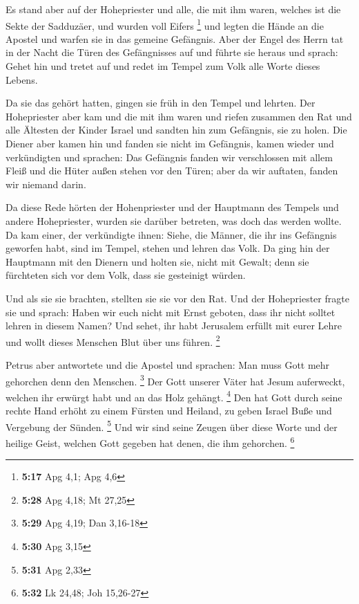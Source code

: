  Es stand aber auf der Hohepriester und alle, die mit ihm
waren, welches ist die Sekte der Sadduzäer, und wurden voll Eifers
\footnote{\textbf{5:17} Apg 4,1; Apg 4,6}  und legten die
Hände an die Apostel und warfen sie in das gemeine Gefängnis.
 Aber der Engel des Herrn tat in der Nacht die Türen des
Gefängnisses auf und führte sie heraus und sprach:  Gehet
hin und tretet auf und redet im Tempel zum Volk alle Worte dieses
Lebens.

 Da sie das gehört hatten, gingen sie früh in den Tempel
und lehrten. Der Hohepriester aber kam und die mit ihm waren und riefen
zusammen den Rat und alle Ältesten der Kinder Israel und sandten hin zum
Gefängnis, sie zu holen.  Die Diener aber kamen hin und
fanden sie nicht im Gefängnis, kamen wieder und verkündigten
 und sprachen: Das Gefängnis fanden wir verschlossen mit
allem Fleiß und die Hüter außen stehen vor den Türen; aber da wir
auftaten, fanden wir niemand darin.

 Da diese Rede hörten der Hohenpriester und der Hauptmann
des Tempels und andere Hohepriester, wurden sie darüber betreten, was
doch das werden wollte.  Da kam einer, der verkündigte
ihnen: Siehe, die Männer, die ihr ins Gefängnis geworfen habt, sind im
Tempel, stehen und lehren das Volk.  Da ging hin der
Hauptmann mit den Dienern und holten sie, nicht mit Gewalt; denn sie
fürchteten sich vor dem Volk, dass sie gesteinigt würden.

 Und als sie sie brachten, stellten sie sie vor den Rat.
Und der Hohepriester fragte sie  und sprach: Haben wir
euch nicht mit Ernst geboten, dass ihr nicht solltet lehren in diesem
Namen? Und sehet, ihr habt Jerusalem erfüllt mit eurer Lehre und wollt
dieses Menschen Blut über uns führen. \footnote{\textbf{5:28} Apg 4,18;
  Mt 27,25}

 Petrus aber antwortete und die Apostel und sprachen: Man
muss Gott mehr gehorchen denn den Menschen. \footnote{\textbf{5:29} Apg
  4,19; Dan 3,16-18}  Der Gott unserer Väter hat Jesum
auferweckt, welchen ihr erwürgt habt und an das Holz gehängt.
\footnote{\textbf{5:30} Apg 3,15}  Den hat Gott durch
seine rechte Hand erhöht zu einem Fürsten und Heiland, zu geben Israel
Buße und Vergebung der Sünden. \footnote{\textbf{5:31} Apg 2,33}
 Und wir sind seine Zeugen über diese Worte und der
heilige Geist, welchen Gott gegeben hat denen, die ihm gehorchen.
\footnote{\textbf{5:32} Lk 24,48; Joh 15,26-27}

